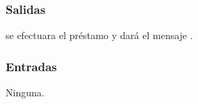 
\subsubsection{Salidas}
	\begin{Citemize}
		\item se efectuara el préstamo y dará el mensaje . 
	\end{Citemize}
	
\subsubsection{Entradas}
	\begin{Citemize}
		\item Ninguna.
	\end{Citemize}



